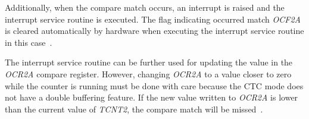 Additionally, when the compare match occurs,
an interrupt is raised and the interrupt service routine is executed.
The flag indicating occurred match {\it{OCF2A}} is
cleared automatically by hardware when executing
the interrupt service routine in this case~\cite{avr-datasheet}.

The interrupt service routine can be further used for updating the value in the {\it{OCR2A}} compare register.
However, changing {\it{OCR2A}} to a value closer to zero while the counter is running
must be done with care because the CTC mode does not have a double buffering feature.
If the new value written to {\it{OCR2A}} is lower than the current
value of {\it{TCNT2}}, the compare match will be missed~\cite{avr-datasheet}.
